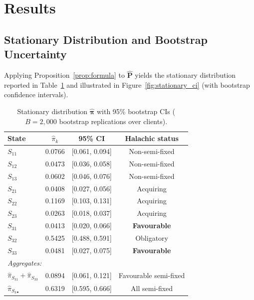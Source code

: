 \documentclass[12pt,a4paper]{article}
\newcommand{\piv}{\boldsymbol{\pi}}
\newcommand{\mat}[1]{\mathbf{#1}}
\begin{document}
\section{Results}
\label{sec:results}

\subsection{Stationary Distribution and Bootstrap Uncertainty}
\label{sec:stationary}

Applying Proposition~\ref{prop:formula} to $\hat{\mat{P}}$ yields the stationary
distribution reported in Table~\ref{tab:stationary} and illustrated in
Figure~\ref{fig:stationary_ci} (with bootstrap confidence intervals).

\begin{table}[ht]
\centering
\caption{Stationary distribution $\hat{\piv}$ with 95\% bootstrap CIs
         ($B = 2{,}000$ bootstrap replications over clients).}
\label{tab:stationary}
\begin{tabular}{l c c c}
\toprule
\textbf{State} & $\hat{\pi}_k$ & \textbf{95\% CI} & \textbf{Halachic status} \\
\midrule
$S_{11}$ & 0.0766 & [0.061, 0.094] & Non-semi-fixed \\
$S_{12}$ & 0.0473 & [0.036, 0.058] & Non-semi-fixed \\
$S_{13}$ & 0.0602 & [0.046, 0.076] & Non-semi-fixed \\
\midrule
$S_{21}$ & 0.0408 & [0.027, 0.056] & Acquiring \\
$S_{22}$ & 0.1169 & [0.103, 0.131] & Acquiring \\
$S_{23}$ & 0.0263 & [0.018, 0.037] & Acquiring \\
\midrule
$S_{31}$ & 0.0413 & [0.020, 0.066] & \textbf{Favourable} \\
$S_{32}$ & 0.5425 & [0.488, 0.591] & Obligatory \\
$S_{33}$ & 0.0481 & [0.027, 0.075] & \textbf{Favourable} \\
\midrule
\multicolumn{4}{l}{\emph{Aggregates:}} \\
$\hat{\pi}_{S_{31}}+\hat{\pi}_{S_{33}}$ & 0.0894 & [0.061, 0.121] & Favourable semi-fixed \\
$\hat{\pi}_{S_{3\bullet}}$ & 0.6319 & [0.595, 0.666] & All semi-fixed \\
\bottomrule
\end{tabular}
\end{table}
\end{document}

